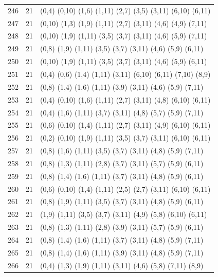 \begin{appendix}
{\begin{longtable}{lll}
    246& 21 & (0,4)   (0,10)  (1,6)   (1,11)  (2,7)   (3,5)   (3,11)  (6,10)  (6,11)\\
    247& 21 & (0,10)  (1,3)   (1,9)   (1,11)  (2,7)   (3,11)  (4,6)   (4,9)   (7,11)\\
    248& 21 & (0,10)  (1,9)   (1,11)  (3,5)   (3,7)   (3,11)  (4,6)   (5,9)   (7,11)\\
    249& 21 & (0,8)   (1,9)   (1,11)  (3,5)   (3,7)   (3,11)  (4,6)   (5,9)   (6,11)\\
    250& 21 & (0,10)  (1,9)   (1,11)  (3,5)   (3,7)   (3,11)  (4,6)   (5,9)   (6,11)\\
    251& 21 & (0,4)   (0,6)   (1,4)   (1,11)  (3,11)  (6,10)  (6,11)  (7,10)  (8,9)\\
    252& 21 & (0,8)   (1,4)   (1,6)   (1,11)  (3,9)   (3,11)  (4,6)   (5,9)   (7,11)\\
    253& 21 & (0,4)   (0,10)  (1,6)   (1,11)  (2,7)   (3,11)  (4,8)   (6,10)  (6,11)\\
    254& 21 & (0,4)   (1,6)   (1,11)  (3,7)   (3,11)  (4,8)   (5,7)   (5,9)   (7,11)\\
    255& 21 & (0,6)   (0,10)  (1,4)   (1,11)  (2,7)   (3,11)  (4,9)   (6,10)  (6,11)\\
    256& 21 & (0,2)   (0,10)  (1,9)   (1,11)  (3,5)   (3,7)   (3,11)  (6,10)  (6,11)\\
    257& 21 & (0,8)   (1,6)   (1,11)  (3,5)   (3,7)   (3,11)  (4,8)   (5,9)   (7,11)\\
    258& 21 & (0,8)   (1,3)   (1,11)  (2,8)   (3,7)   (3,11)  (5,7)   (5,9)   (6,11)\\
    259& 21 & (0,8)   (1,4)   (1,6)   (1,11)  (3,7)   (3,11)  (4,8)   (5,9)   (6,11)\\
    260& 21 & (0,6)   (0,10)  (1,4)   (1,11)  (2,5)   (2,7)   (3,11)  (6,10)  (6,11)\\
    261& 21 & (0,8)   (1,9)   (1,11)  (3,5)   (3,7)   (3,11)  (4,8)   (5,9)   (6,11)\\
    262& 21 & (1,9)   (1,11)  (3,5)   (3,7)   (3,11)  (4,9)   (5,8)   (6,10)  (6,11)\\
    263& 21 & (0,8)   (1,3)   (1,11)  (2,8)   (3,9)   (3,11)  (5,7)   (5,9)   (6,11)\\
    264& 21 & (0,8)   (1,4)   (1,6)   (1,11)  (3,7)   (3,11)  (4,8)   (5,9)   (7,11)\\
    265& 21 & (0,8)   (1,4)   (1,6)   (1,11)  (3,9)   (3,11)  (4,8)   (5,9)   (7,11)\\
    266& 21 & (0,4)   (1,3)   (1,9)   (1,11)  (3,11)  (4,6)   (5,8)   (7,11)  (8,9)\\

\end{longtable}}
\end{appendix}
